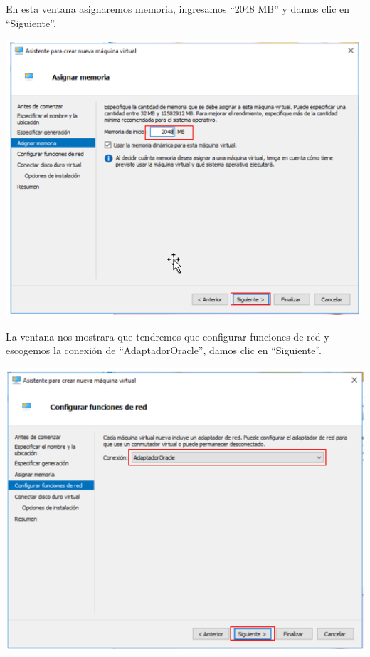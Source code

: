 \vspace{\baselineskip}

En esta ventana asignaremos memoria, ingresamos “2048 MB” y damos clic en “Siguiente”. 
	\begin{center}
		\includegraphics[width=13.2cm]{./Imagenes/18} 
	\end{center} 

\vspace{\baselineskip}

La ventana nos mostrara que tendremos que configurar funciones de red y escogemos la conexión de “AdaptadorOracle”, damos clic en “Siguiente”. 
	\begin{center}
		\includegraphics[width=14cm]{./Imagenes/19} 
	\end{center} 

